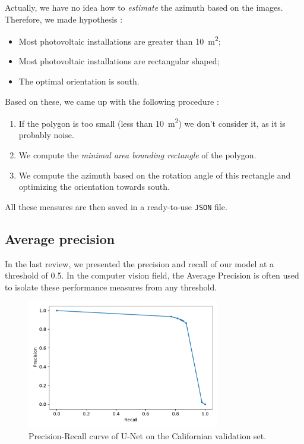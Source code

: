 \documentclass[a4paper, 12pt]{article}
\begin{document}
Actually, we have no idea how to \emph{estimate} the azimuth based on the images. Therefore, we made hypothesis :

\begin{itemize}
    \item Most photovoltaic installations are greater than \SI{10}{\meter\squared};
    \item Most photovoltaic installations are rectangular shaped;
    \item The optimal orientation is south.
\end{itemize}

Based on these, we came up with the following procedure :

\begin{enumerate}
    \item If the polygon is too small (less than \SI{10}{\meter\squared}) we don't consider it, as it is probably noise.
    \item We compute the \emph{minimal area bounding rectangle} of the polygon.
    \item We compute the azimuth based on the rotation angle of this rectangle and optimizing the orientation towards south.
\end{enumerate}

All these measures are then saved in a ready-to-use \texttt{JSON} file.

\subsection{Average precision}\label{sec:average_precision}

In the last review, we presented the precision and recall of our model at a threshold of \num{0.5}. In the computer vision field, the Average Precision is often used to isolate these performance measures from any threshold.

\begin{figure}[h]
    \centering
    \includegraphics[width=0.75\textwidth]{resources/pdf/precision_recall.pdf}
    \caption{Precision-Recall curve of U-Net on the Californian validation set.}
    \label{fig:after_fine_tuning}
\end{figure}
\end{document}
